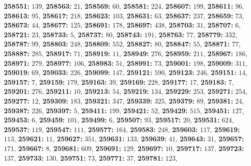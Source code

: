 \textsf{\bfseries 258551:} $139$, \textsf{\bfseries 258563:} $21$, \textsf{\bfseries 258569:} $60$, \textsf{\bfseries 258581:} $224$, \textsf{\bfseries 258607:} $199$, \textsf{\bfseries 258611:} $96$, \textsf{\bfseries 258613:} $95$, \textsf{\bfseries 258617:} $218$, \textsf{\bfseries 258623:} $103$, \textsf{\bfseries 258631:} $63$, \textsf{\bfseries 258637:} $237$, \textsf{\bfseries 258659:} $73$, \textsf{\bfseries 258673:} $44$, \textsf{\bfseries 258677:} $125$, \textsf{\bfseries 258691:} $178$, \textsf{\bfseries 258697:} $438$, \textsf{\bfseries 258703:} $31$, \textsf{\bfseries 258707:} $6$, \textsf{\bfseries 258721:} $23$, \textsf{\bfseries 258733:} $5$, \textsf{\bfseries 258737:} $80$, \textsf{\bfseries 258743:} $191$, \textsf{\bfseries 258763:} $77$, \textsf{\bfseries 258779:} $332$, \textsf{\bfseries 258787:} $99$, \textsf{\bfseries 258803:} $248$, \textsf{\bfseries 258809:} $552$, \textsf{\bfseries 258827:} $80$, \textsf{\bfseries 258847:} $55$, \textsf{\bfseries 258871:} $77$, \textsf{\bfseries 258887:} $285$, \textsf{\bfseries 258917:} $71$, \textsf{\bfseries 258919:} $11$, \textsf{\bfseries 258949:} $276$, \textsf{\bfseries 258959:} $211$, \textsf{\bfseries 258967:} $186$, \textsf{\bfseries 258971:} $279$, \textsf{\bfseries 258977:} $106$, \textsf{\bfseries 258983:} $51$, \textsf{\bfseries 258991:} $73$, \textsf{\bfseries 259001:} $198$, \textsf{\bfseries 259009:} $311$, \textsf{\bfseries 259019:} $69$, \textsf{\bfseries 259033:} $226$, \textsf{\bfseries 259099:} $147$, \textsf{\bfseries 259121:} $590$, \textsf{\bfseries 259123:} $246$, \textsf{\bfseries 259151:} $14$, \textsf{\bfseries 259157:} $7$, \textsf{\bfseries 259159:} $179$, \textsf{\bfseries 259163:} $39$, \textsf{\bfseries 259169:} $228$, \textsf{\bfseries 259177:} $17$, \textsf{\bfseries 259183:} $7$, \textsf{\bfseries 259201:} $276$, \textsf{\bfseries 259211:} $10$, \textsf{\bfseries 259213:} $54$, \textsf{\bfseries 259219:} $134$, \textsf{\bfseries 259229:} $253$, \textsf{\bfseries 259271:} $254$, \textsf{\bfseries 259277:} $12$, \textsf{\bfseries 259309:} $183$, \textsf{\bfseries 259321:} $347$, \textsf{\bfseries 259339:} $325$, \textsf{\bfseries 259379:} $89$, \textsf{\bfseries 259381:} $24$, \textsf{\bfseries 259387:} $226$, \textsf{\bfseries 259397:} $5$, \textsf{\bfseries 259411:} $199$, \textsf{\bfseries 259421:} $52$, \textsf{\bfseries 259429:} $515$, \textsf{\bfseries 259451:} $127$, \textsf{\bfseries 259453:} $6$, \textsf{\bfseries 259459:} $101$, \textsf{\bfseries 259499:} $6$, \textsf{\bfseries 259507:} $93$, \textsf{\bfseries 259517:} $20$, \textsf{\bfseries 259531:} $624$, \textsf{\bfseries 259537:} $119$, \textsf{\bfseries 259547:} $111$, \textsf{\bfseries 259577:} $164$, \textsf{\bfseries 259583:} $248$, \textsf{\bfseries 259603:} $117$, \textsf{\bfseries 259619:} $113$, \textsf{\bfseries 259621:} $11$, \textsf{\bfseries 259627:} $351$, \textsf{\bfseries 259631:} $133$, \textsf{\bfseries 259639:} $41$, \textsf{\bfseries 259643:} $31$, \textsf{\bfseries 259657:} $171$, \textsf{\bfseries 259667:} $8$, \textsf{\bfseries 259681:} $609$, \textsf{\bfseries 259691:} $129$, \textsf{\bfseries 259697:} $10$, \textsf{\bfseries 259717:} $137$, \textsf{\bfseries 259723:} $137$, \textsf{\bfseries 259733:} $130$, \textsf{\bfseries 259751:} $73$, \textsf{\bfseries 259771:} $37$, \textsf{\bfseries 259781:} $123$, 
